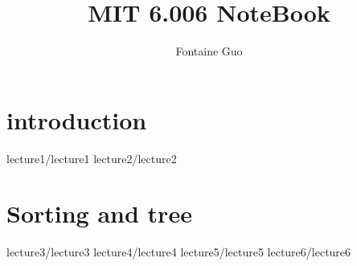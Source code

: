 \documentclass[a4paper]{book}
\title{MIT 6.006 NoteBook}
\author{Fontaine Guo}
\begin{document}
    \maketitle
    \chapter{introduction}
        {lecture1/lecture1}
        {lecture2/lecture2}

    \chapter{Sorting and tree}
        {lecture3/lecture3}
        {lecture4/lecture4}
        {lecture5/lecture5}
        {lecture6/lecture6}
\end{document}
